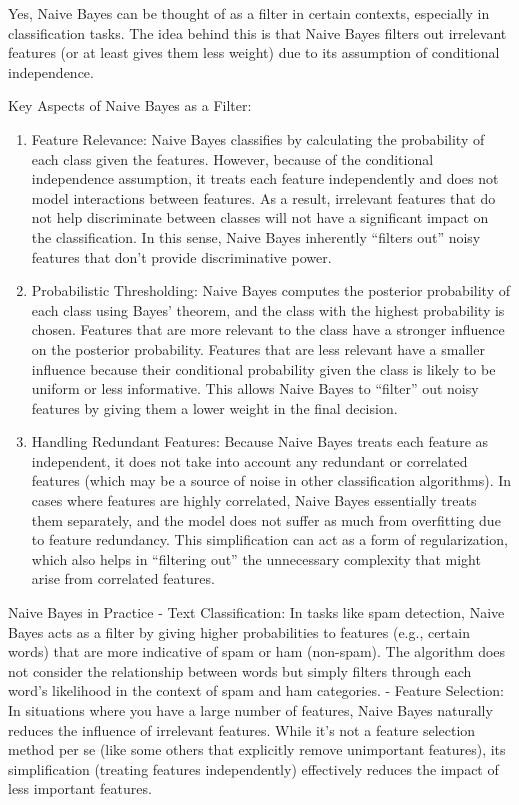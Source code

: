 \documentclass[
  12 pt,
  a4paper,
]{book}
\numberwithin{equation}{section}
\theoremstyle{plain}      %
\theoremstyle{definition} %
\theoremstyle{remark}     %
\theoremstyle{note}         %
\begin{document}
Yes, Naive Bayes can be thought of as a filter in certain contexts,
especially in classification tasks. The idea behind this is that Naive
Bayes filters out irrelevant features (or at least gives them less
weight) due to its assumption of conditional independence.

Key Aspects of Naive Bayes as a Filter:

\begin{enumerate}
\def\labelenumi{\arabic{enumi}.}
\item
  Feature Relevance: Naive Bayes classifies by calculating the
  probability of each class given the features. However, because of the
  conditional independence assumption, it treats each feature
  independently and does not model interactions between features. As a
  result, irrelevant features that do not help discriminate between
  classes will not have a significant impact on the classification. In
  this sense, Naive Bayes inherently ``filters out'' noisy features that
  don't provide discriminative power.
\item
  Probabilistic Thresholding: Naive Bayes computes the posterior
  probability of each class using Bayes' theorem, and the class with the
  highest probability is chosen. Features that are more relevant to the
  class have a stronger influence on the posterior probability. Features
  that are less relevant have a smaller influence because their
  conditional probability given the class is likely to be uniform or
  less informative. This allows Naive Bayes to ``filter'' out noisy
  features by giving them a lower weight in the final decision.
\item
  Handling Redundant Features: Because Naive Bayes treats each feature
  as independent, it does not take into account any redundant or
  correlated features (which may be a source of noise in other
  classification algorithms). In cases where features are highly
  correlated, Naive Bayes essentially treats them separately, and the
  model does not suffer as much from overfitting due to feature
  redundancy. This simplification can act as a form of regularization,
  which also helps in ``filtering out'' the unnecessary complexity that
  might arise from correlated features.
\end{enumerate}

\newpage

Naive Bayes in Practice - Text Classification: In tasks like spam
detection, Naive Bayes acts as a filter by giving higher probabilities
to features (e.g., certain words) that are more indicative of spam or
ham (non-spam). The algorithm does not consider the relationship between
words but simply filters through each word's likelihood in the context
of spam and ham categories. - Feature Selection: In situations where you
have a large number of features, Naive Bayes naturally reduces the
influence of irrelevant features. While it's not a feature selection
method per se (like some others that explicitly remove unimportant
features), its simplification (treating features independently)
effectively reduces the impact of less important features.
\end{document}
